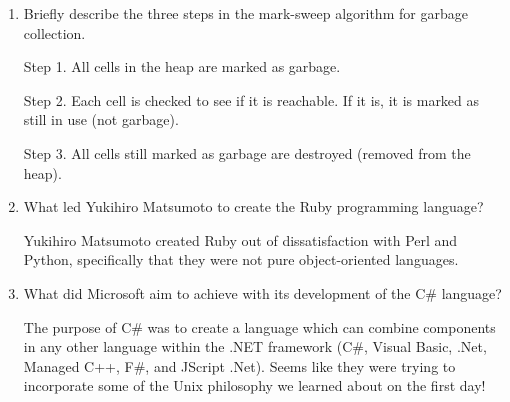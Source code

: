 \begin{enumerate}
\begin{answer}
    \end{answer}

  \item Briefly describe the three steps in the mark-sweep algorithm
    for garbage collection.

  \begin{answer}

    Step 1. All cells in the heap are marked as garbage.

    Step 2. Each cell is checked to see if it is reachable. If it is,
    it is marked as still in use (not garbage).

    Step 3. All cells still marked as garbage are destroyed (removed
    from the heap).

    \end{answer}

  \item What led Yukihiro Matsumoto to create the Ruby programming language?

  \begin{answer}

    Yukihiro Matsumoto created Ruby out of dissatisfaction with Perl
    and Python, specifically that they were not pure object-oriented
    languages.

    \end{answer}

  \item What did Microsoft aim to achieve with its development of the
    C\# language?

  \begin{answer}

    The purpose of C\# was to create a language which can combine
    components in any other language within the .NET framework (C\#,
    Visual Basic, .Net, Managed C++, F\#, and JScript .Net). Seems
    like they were trying to incorporate some of the Unix philosophy
    we learned about on the first day!

    \end{answer}

  \end{enumerate}


